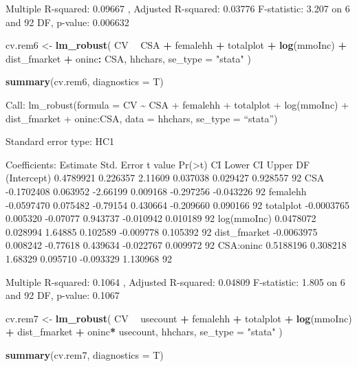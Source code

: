 \documentclass[
]{article}
\newenvironment{Shaded}{\begin{snugshade}}{\end{snugshade}}
\newcommand{\DataTypeTok}[1]{\textcolor[rgb]{0.13,0.29,0.53}{#1}}
\newcommand{\KeywordTok}[1]{\textcolor[rgb]{0.13,0.29,0.53}{\textbf{#1}}}
\newcommand{\NormalTok}[1]{#1}
\newcommand{\OperatorTok}[1]{\textcolor[rgb]{0.81,0.36,0.00}{\textbf{#1}}}
\newcommand{\StringTok}[1]{\textcolor[rgb]{0.31,0.60,0.02}{#1}}
\begin{document}
Multiple R-squared: 0.09667 , Adjusted R-squared: 0.03776 F-statistic:
3.207 on 6 and 92 DF, p-value: 0.006632

\begin{Shaded}
\begin{Highlighting}[]
\NormalTok{cv.rem6 <-}
\StringTok{  }\KeywordTok{lm_robust}\NormalTok{(}
\NormalTok{    CV }\OperatorTok{~}\StringTok{ }\NormalTok{CSA }\OperatorTok{+}\StringTok{ }\NormalTok{femalehh  }\OperatorTok{+}\StringTok{ }\NormalTok{totalplot }\OperatorTok{+}\StringTok{ }\KeywordTok{log}\NormalTok{(mmoInc) }\OperatorTok{+}\StringTok{ }\NormalTok{dist_fmarket }\OperatorTok{+}\StringTok{ }\NormalTok{oninc}\OperatorTok{:}
\StringTok{      }\NormalTok{CSA,}
\NormalTok{    hhchars,}
    \DataTypeTok{se_type =} \StringTok{"stata"}
\NormalTok{  )}

\KeywordTok{summary}\NormalTok{(cv.rem6, }\DataTypeTok{diagnostics =}\NormalTok{ T)}
\end{Highlighting}
\end{Shaded}

Call: lm\_robust(formula = CV \textasciitilde{} CSA + femalehh +
totalplot + log(mmoInc) + dist\_fmarket + oninc:CSA, data = hhchars,
se\_type = ``stata'')

Standard error type: HC1

Coefficients: Estimate Std. Error t value
Pr(\textgreater\textbar t\textbar) CI Lower CI Upper DF (Intercept)
0.4789921 0.226357 2.11609 0.037038 0.029427 0.928557 92 CSA -0.1702408
0.063952 -2.66199 0.009168 -0.297256 -0.043226 92 femalehh -0.0597470
0.075482 -0.79154 0.430664 -0.209660 0.090166 92 totalplot -0.0003765
0.005320 -0.07077 0.943737 -0.010942 0.010189 92 log(mmoInc) 0.0478072
0.028994 1.64885 0.102589 -0.009778 0.105392 92 dist\_fmarket -0.0063975
0.008242 -0.77618 0.439634 -0.022767 0.009972 92 CSA:oninc 0.5188196
0.308218 1.68329 0.095710 -0.093329 1.130968 92

Multiple R-squared: 0.1064 , Adjusted R-squared: 0.04809 F-statistic:
1.805 on 6 and 92 DF, p-value: 0.1067

\begin{Shaded}
\begin{Highlighting}[]
\NormalTok{cv.rem7 <-}
\StringTok{  }\KeywordTok{lm_robust}\NormalTok{(}
\NormalTok{    CV }\OperatorTok{~}\StringTok{ }\NormalTok{usecount }\OperatorTok{+}\StringTok{ }\NormalTok{femalehh  }\OperatorTok{+}\StringTok{ }\NormalTok{totalplot }\OperatorTok{+}\StringTok{ }\KeywordTok{log}\NormalTok{(mmoInc) }\OperatorTok{+}\StringTok{ }\NormalTok{dist_fmarket }\OperatorTok{+}\StringTok{ }\NormalTok{oninc}\OperatorTok{*}
\StringTok{      }\NormalTok{usecount,}
\NormalTok{    hhchars,}
    \DataTypeTok{se_type =} \StringTok{"stata"}
\NormalTok{  )}

\KeywordTok{summary}\NormalTok{(cv.rem7, }\DataTypeTok{diagnostics =}\NormalTok{ T)}
\end{Highlighting}
\end{Shaded}
\end{document}
